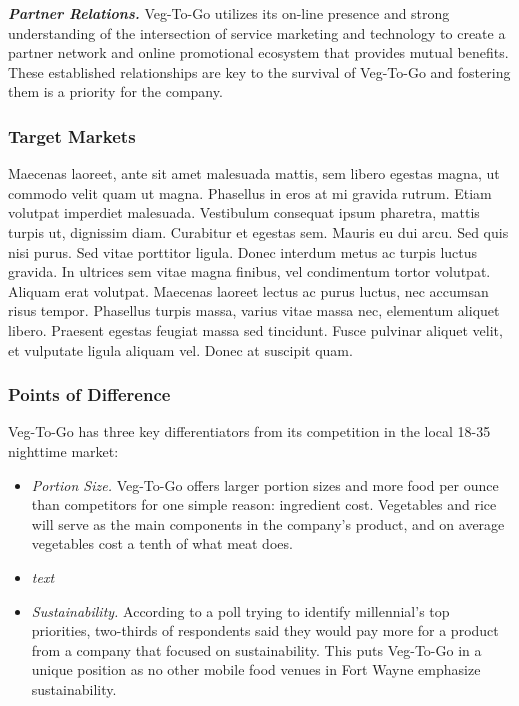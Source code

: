 \documentclass[12pt, letterpaper]{article}
\newcommand{\companyname}{Veg-To-Go}
\begin{document}
\textbf{\emph{Partner Relations.}} \companyname{} utilizes its on-line presence and strong understanding of the intersection of service marketing and technology to create a partner network and online promotional ecosystem that provides mutual benefits. These established relationships are key to the survival of \companyname{} and fostering them is a priority for the company.

\subsubsection{Target Markets}
Maecenas laoreet, ante sit amet malesuada mattis, sem libero egestas magna, ut commodo velit quam ut magna. Phasellus in eros at mi gravida rutrum. Etiam volutpat imperdiet malesuada. Vestibulum consequat ipsum pharetra, mattis turpis ut, dignissim diam. Curabitur et egestas sem. Mauris eu dui arcu. Sed quis nisi purus. Sed vitae porttitor ligula. Donec interdum metus ac turpis luctus gravida. In ultrices sem vitae magna finibus, vel condimentum tortor volutpat. Aliquam erat volutpat. Maecenas laoreet lectus ac purus luctus, nec accumsan risus tempor. Phasellus turpis massa, varius vitae massa nec, elementum aliquet libero. Praesent egestas feugiat massa sed tincidunt. Fusce pulvinar aliquet velit, et vulputate ligula aliquam vel. Donec at suscipit quam.
\subsubsection{Points of Difference}
\companyname{} has three key differentiators from its competition in the local 18-35 nighttime market:

\begin{itemize}
	\item \emph{Portion Size.}  \companyname{} offers larger portion sizes and more food per ounce than competitors for one simple reason: ingredient cost.  Vegetables and rice will serve as the main components in the company's product, and on average vegetables cost a tenth of what meat does. \cite{costs}
	\item \emph{text}
	\item \emph{Sustainability.} According to a poll trying to identify millennial's top priorities, two-thirds of respondents said they would pay more for a product from a company that focused on sustainability. \cite{millennials} This puts \companyname{} in a unique position as no other mobile food venues in Fort Wayne emphasize sustainability.
\end{itemize}
\end{document}
